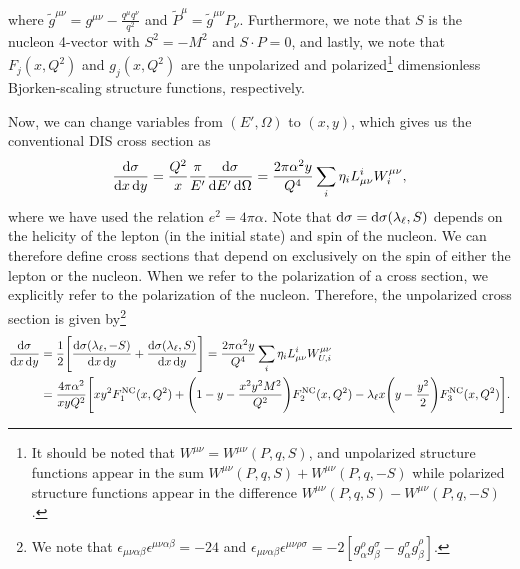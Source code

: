 \documentclass[aps,prd,amsmath,superscriptaddress,floatfix,nofootinbib]{revtex4-2}
\newcommand{\diff}[1]{{\rm d} #1}
\begin{document}
where $\displaystyle \tilde{g}^{\mu\nu} = g^{\mu\nu} - \frac{q^{\mu}q^{\nu}}{q^2}$ and $\tilde{P}^{\mu} = \tilde{g}^{\mu\nu} P_{\nu}$.
Furthermore, we note that $S$ is the nucleon 4-vector with $S^2 = -M^2$ and $S \cdot P = 0$, and lastly, we note that $F_{j}(x,Q^2)$ and $g_{j}(x,Q^2)$ are the unpolarized and polarized\footnote{It should be noted that $W^{\mu\nu} = W^{\mu\nu}(P,q,S)$, and unpolarized structure functions appear in the sum $W^{\mu\nu}(P,q,S) + W^{\mu\nu}(P,q,-S)$ while polarized structure functions appear in the difference $W^{\mu\nu}(P,q,S) - W^{\mu\nu}(P,q,-S)$.} dimensionless Bjorken-scaling structure functions, respectively.

Now, we can change variables from $(E',\Omega)$ to $(x,y)$, which gives us the conventional DIS cross section as
\begin{eqnarray}
\label{eq:xsec-xy}
    \frac{\diff \sigma}{\diff x \, \diff y} = \frac{Q^2}{x} \frac{\pi}{E'} \frac{\diff \sigma}{\diff E' \, \diff \Omega} = \frac{2 \pi \alpha^2 y}{Q^4} \sum_{i} \eta_{i} L_{\mu\nu}^{i}W_{i}^{\mu\nu}
,\end{eqnarray}
where we have used the relation $e^2 = 4\pi\alpha$.
Note that $\diff \sigma = \diff \sigma(\lambda_{\ell}, S)$ depends on the helicity of the lepton (in the initial state) and spin of the nucleon.
We can therefore define cross sections that depend on exclusively on the spin of either the lepton or the nucleon.
When we refer to the polarization of a cross section, we explicitly refer to the polarization of the nucleon.
Therefore, the unpolarized cross section is given by\footnote{We note that $\epsilon_{\mu\nu\alpha\beta}\epsilon^{\mu\nu\alpha\beta} = -24$ and $\epsilon_{\mu\nu\alpha\beta}\epsilon^{\mu\nu\rho\sigma} = -2 [ g_{\alpha}^{\rho}g_{\beta}^{\sigma} - g_{\alpha}^{\sigma}g_{\beta}^{\rho} ]$.}
\begin{eqnarray}
\label{eq:upol-xsec}
\begin{aligned}    
    \frac{\diff \sigma}{\diff x \, \diff y} &= \frac{1}{2} \Bigg[ \frac{\diff \sigma(\lambda_{\ell},-S)}{\diff x \, \diff y} + \frac{\diff \sigma(\lambda_{\ell},S)}{\diff x \, \diff y} \Bigg] = \frac{2 \pi \alpha^2 y}{Q^{4}} \sum_{i} \eta_{i} L_{\mu\nu}^{i} W^{\mu\nu}_{U,i} \\
                                                &= \frac{4 \pi \alpha^2}{x y Q^2} \Bigg[ xy^2 F_{1}^{\rm NC}(x,Q^2) + \Bigg( 1 - y - \frac{x^2 y^2 M^2}{Q^2} \Bigg) F_{2}^{\rm NC}(x,Q^2) - \lambda_{\ell} x \Bigg( y - \frac{y^2}{2} \Bigg) F_{3}^{\rm NC}(x,Q^2) \Bigg]
.\end{aligned}
\end{eqnarray}
\end{document}
